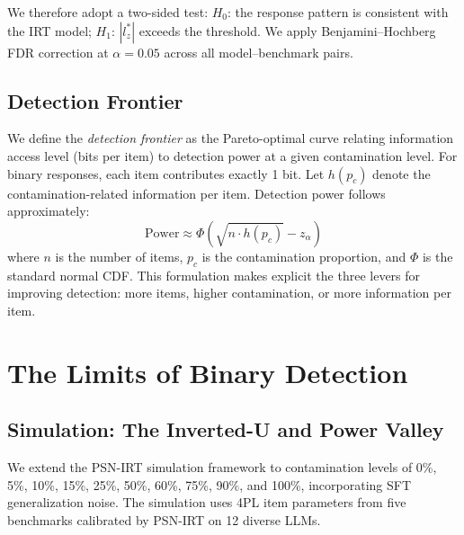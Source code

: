 \documentclass[11pt,a4paper]{article}
\begin{document}
We therefore adopt a two-sided test: $H_0$: the response pattern is consistent with the IRT model; $H_1$: $|l_z^*|$ exceeds the threshold. We apply Benjamini--Hochberg FDR correction at $\alpha = 0.05$ across all model--benchmark pairs.

\subsection{Detection Frontier}

We define the \emph{detection frontier} as the Pareto-optimal curve relating information access level (bits per item) to detection power at a given contamination level. For binary responses, each item contributes exactly 1 bit. Let $h(p_c)$ denote the contamination-related information per item. Detection power follows approximately:
\begin{equation}
\text{Power} \approx \Phi\!\left(\sqrt{n \cdot h(p_c)} - z_\alpha\right)
\label{eq:power}
\end{equation}
where $n$ is the number of items, $p_c$ is the contamination proportion, and $\Phi$ is the standard normal CDF. This formulation makes explicit the three levers for improving detection: more items, higher contamination, or more information per item.

\section{The Limits of Binary Detection}

\subsection{Simulation: The Inverted-U and Power Valley}
\label{sec:simulation}

We extend the PSN-IRT simulation framework to contamination levels of 0\%, 5\%, 10\%, 15\%, 25\%, 50\%, 60\%, 75\%, 90\%, and 100\%, incorporating SFT generalization noise. The simulation uses 4PL item parameters from five benchmarks calibrated by PSN-IRT on 12 diverse LLMs.
\end{document}
